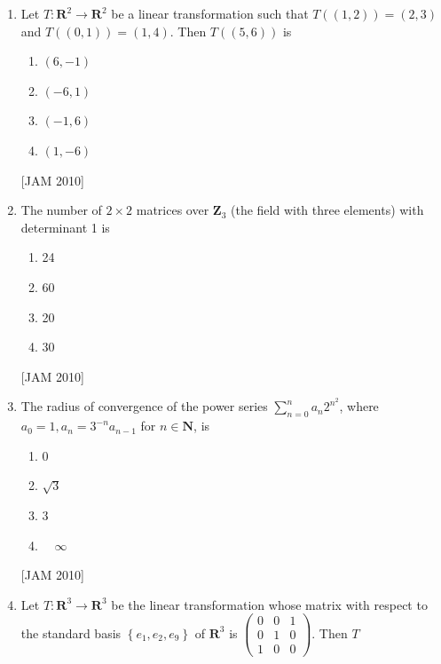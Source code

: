 \begin{enumerate}
\item  Let $T: \mathbf{R}^{2} \rightarrow \mathbf{R}^{2}$ be a linear transformation such that $T((1,2))=(2,3)$ and $T((0,1))=(1,4)$. Then $T((5,6))$ is 

\begin{enumerate}
\item $(6,-1)$ 
\item $(-6,1)$ 
\item $(-1,6)$ 
\item $(1,-6)$
\end{enumerate}
\hfill [JAM 2010]




\item  The number of $2 \times 2$ matrices over $\mathbf{Z}_{3}$ (the field with three elements) with determinant 1 is 

\begin{enumerate}
    \item 24 
\item 60 
\item 20 
\item 30
\end{enumerate}
\hfill [JAM 2010]





\item  The radius of convergence of the power series $\sum_{n=0}^{n} a_{n} 2^{n^{2}}$, where $a_{0}=1, a_{n}=3^{-n} a_{n-1}$ for $n \in \mathbf{N}$, is 

\begin{enumerate}
    
\item 0 
\item $\sqrt{3}$ 
\item 3 
\item $\quad \infty$
\end{enumerate}
\hfill [JAM 2010]




\item  Let $T: \mathbf{R}^{3} \rightarrow \mathbf{R}^{3}$ be the linear transformation whose matrix with respect to the standard basis $\left\{e_{1}, e_{2}, e_{9}\right\}$ of $\mathbf{R}^{3}$ is $\left(\begin{array}{lll}0 & 0 & 1 \\ 0 & 1 & 0 \\ 1 & 0 & 0\end{array}\right)$. Then $T$ 

\begin{enumerate}
    

\end{enumerate}
\end{enumerate}
